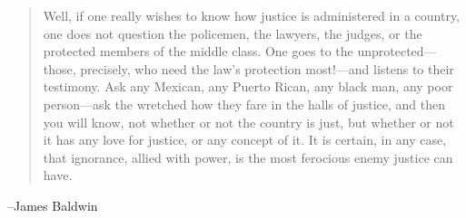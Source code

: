 \documentclass{exam}
\begin{document}
\else
  \vspace{6 cm}
  \begin{quote}
    \begin{em}
      Well, if one really wishes to know how justice is administered in a country, one does not question the policemen,
      the lawyers, the judges, or the protected members of the middle class. One goes to the unprotected---those,
      precisely, who need the law's protection most!---and listens to their testimony. Ask any Mexican, any Puerto
      Rican, any black man, any poor person---ask the wretched how they fare in the halls of justice, and then you will
      know, not whether or not the country is just, but whether or not it has any love for justice, or any concept of
      it. It is certain, in any case, that ignorance, allied with power, is the most ferocious enemy justice can have.
    \end{em}
  \end{quote}

  \hspace{1 cm} --James Baldwin


\fi
\end{document}
